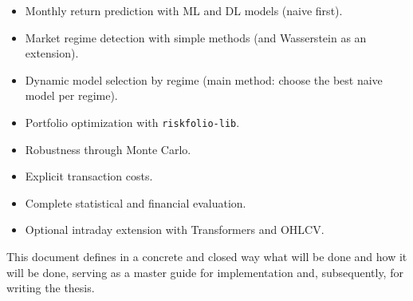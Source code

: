\documentclass[12pt]{article}
\begin{document}
\begin{itemize}
    \item Monthly return prediction with ML and DL models (naive first).
    \item Market regime detection with simple methods (and Wasserstein as an extension).
    \item Dynamic model selection by regime (main method: choose the best naive model per regime).
    \item Portfolio optimization with \texttt{riskfolio-lib}.
    \item Robustness through Monte Carlo.
    \item Explicit transaction costs.
    \item Complete statistical and financial evaluation.
    \item Optional intraday extension with Transformers and OHLCV.
\end{itemize}

This document defines in a concrete and closed way what will be done and how it will be done, serving as a master guide for implementation and, subsequently, for writing the thesis.
\end{document}
